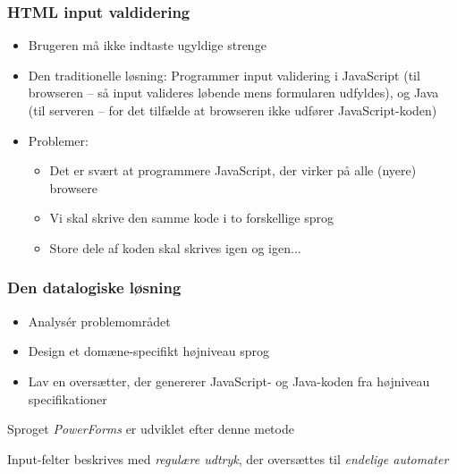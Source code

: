 \documentclass[]{beamer}
\begin{document}
\begin{frame}
\frametitle{HTML input valdidering}
\begin{itemize}[<+->]
\item Brugeren må ikke indtaste ugyldige strenge

\item Den traditionelle løsning: Programmer input validering i
JavaScript (til browseren – så input valideres løbende mens formularen udfyldes), og
Java (til serveren – for det tilfælde at browseren ikke udfører JavaScript-koden)
\item Problemer:
\begin{itemize}
\item Det er svært at programmere JavaScript, der virker på alle (nyere) browsere 
\item Vi skal skrive den samme kode i to forskellige sprog 
\item Store dele af koden skal skrives igen og igen...     
\end{itemize}
\end{itemize}
\end{frame}

\begin{frame}
\frametitle{Den datalogiske løsning}
\begin{itemize}[<+->]
\item Analysér problemområdet
\item Design et domæne-specifikt højniveau sprog
\item Lav en oversætter, der genererer JavaScript- og Java-koden fra højniveau specifikationer
\end{itemize}

Sproget \emph{PowerForms} er udviklet efter denne metode

Input-felter beskrives med \emph{regulære udtryk}, der oversættes til \emph{endelige automater}
\end{frame}
\end{document}
